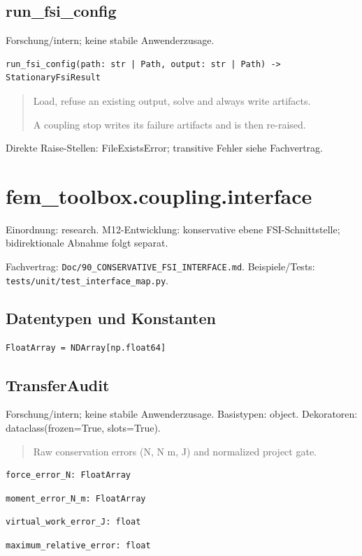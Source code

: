 \subsection{run\_fsi\_config}
Forschung/intern; keine stabile Anwenderzusage.
\begin{lstlisting}
run_fsi_config(path: str | Path, output: str | Path) -> StationaryFsiResult
\end{lstlisting}
\begin{quote}
Load, refuse an existing output, solve and always write artifacts.\par A coupling stop writes its failure artifacts and is then re-raised.
\end{quote}
Direkte Raise-Stellen: FileExistsError; transitive Fehler siehe Fachvertrag.
\section{fem\_toolbox.coupling.interface}
Einordnung: research. M12-Entwicklung: konservative ebene FSI-Schnittstelle; bidirektionale Abnahme folgt separat.
\par Fachvertrag: \nolinkurl{Doc/90_CONSERVATIVE_FSI_INTERFACE.md}. Beispiele/Tests:
\nolinkurl{tests/unit/test_interface_map.py}.
\subsection*{Datentypen und Konstanten}
\begin{lstlisting}
FloatArray = NDArray[np.float64]
\end{lstlisting}
\subsection{TransferAudit}
Forschung/intern; keine stabile Anwenderzusage.
Basistypen: object. Dekoratoren: dataclass(frozen=True, slots=True).
\begin{quote}
Raw conservation errors (N, N m, J) and normalized project gate.
\end{quote}
\begin{lstlisting}
force_error_N: FloatArray
\end{lstlisting}
\begin{lstlisting}
moment_error_N_m: FloatArray
\end{lstlisting}
\begin{lstlisting}
virtual_work_error_J: float
\end{lstlisting}
\begin{lstlisting}
maximum_relative_error: float
\end{lstlisting}
